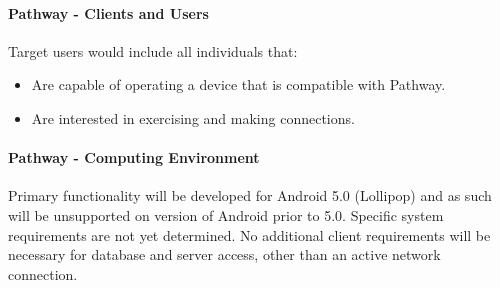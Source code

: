 ﻿\documentclass{article}
\begin{document}
\paragraph{Pathway - Clients and Users}
Target users would include all individuals that:
\begin{itemize}
    \item Are capable of operating a device that is compatible with Pathway.
    \item Are interested in exercising and making connections.
\end{itemize}

\paragraph{Pathway - Computing Environment}
Primary functionality will be developed for Android 5.0 (Lollipop) and as such will be unsupported on version of Android prior to 5.0. Specific system requirements are not yet determined. No additional client requirements will be necessary for database and server access, other than an active network connection.
\end{document}
